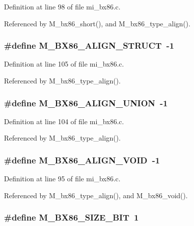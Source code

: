 Definition at line 98 of file mi\_\-bx86.c.

Referenced by M\_\-bx86\_\-short(), and M\_\-bx86\_\-type\_\-align().
\subsubsection{\setlength{\rightskip}{0pt plus 5cm}\#define M\_\-BX86\_\-ALIGN\_\-STRUCT~-1}\label{mi__bx86_8c_8debda573b86b86dbe48d3a92a61710f}




Definition at line 105 of file mi\_\-bx86.c.

Referenced by M\_\-bx86\_\-type\_\-align().
\subsubsection{\setlength{\rightskip}{0pt plus 5cm}\#define M\_\-BX86\_\-ALIGN\_\-UNION~-1}\label{mi__bx86_8c_764a1f86e671b76658e3a9650d1663dc}




Definition at line 104 of file mi\_\-bx86.c.

Referenced by M\_\-bx86\_\-type\_\-align().
\subsubsection{\setlength{\rightskip}{0pt plus 5cm}\#define M\_\-BX86\_\-ALIGN\_\-VOID~-1}\label{mi__bx86_8c_f4dc3b2cbe6c7efd38b4a8040fb7f4cf}




Definition at line 95 of file mi\_\-bx86.c.

Referenced by M\_\-bx86\_\-type\_\-align(), and M\_\-bx86\_\-void().
\subsubsection{\setlength{\rightskip}{0pt plus 5cm}\#define M\_\-BX86\_\-SIZE\_\-BIT~1}\label{mi__bx86_8c_c57ce8839d41d938e8496ba486c824f2}




